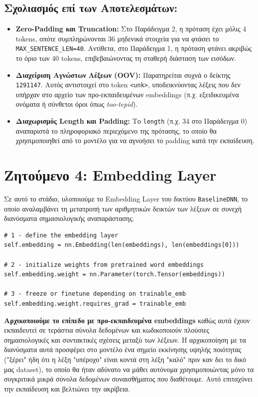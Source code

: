 \documentclass[12pt]{article}
\begin{document}
\subsection*{Σχολιασμός επί των Αποτελεσμάτων:}
\begin{itemize}
    \item \textbf{Zero-Padding και Truncation:} Στο Παράδειγμα 2, η πρόταση έχει μόλις 4 tokens, οπότε συμπληρώνονται 36 μηδενικά στοιχεία για να φτάσει το \texttt{MAX\_SENTENCE\_LEN=40}. Αντίθετα, στο Παράδειγμα 1, η πρόταση φτάνει ακριβώς το όριο των 40 tokens, επιβεβαιώνοντας τη σταθερή διάσταση των εισόδων.
    \item \textbf{Διαχείριση Αγνώστων Λέξεων (OOV):} Παρατηρείται συχνά ο δείκτης \texttt{1291147}. Αυτός αντιστοιχεί στο token \texttt{<unk>}, υποδεικνύοντας λέξεις που δεν υπήρχαν στο αρχείο των προ-εκπαιδευμένων embeddings (π.χ. εξειδικευμένα ονόματα ή σύνθετοι όροι όπως \textit{too-tepid}).
    \item \textbf{Διαχωρισμός Length και Padding:} Το \texttt{length} (π.χ. 34 στο Παράδειγμα 0) αναπαριστά το πληροφοριακό περιεχόμενο της πρότασης, το οποίο θα χρησιμοποιηθεί από το μοντέλο για να αγνοήσει το padding κατά την εκπαίδευση.
\end{itemize}

\section{Ζητούμενο 4: Embedding Layer}

Σε αυτό το στάδιο, υλοποιούμε το Embedding Layer του δικτύου \texttt{BaselineDNN}, το οποίο αναλαμβάνει τη μετατροπή των αριθμητικών δεικτών των λέξεων σε συνεχή διανύσματα σημασιολογικής αναπαράστασης.

\begin{lstlisting}
# 1 - define the embedding layer
self.embedding = nn.Embedding(len(embeddings), len(embeddings[0]))

# 2 - initialize weights from pretrained word embeddings
self.embedding.weight = nn.Parameter(torch.Tensor(embeddings))

# 3 - freeze or finetune depending on trainable_emb
self.embedding.weight.requires_grad = trainable_emb
\end{lstlisting}

\textbf{ Αρχικοποιούμε το επίπεδο με προ-εκπαιδευμένα embeddings}
καθώς αυτά έχουν εκπαιδευτεί σε τεράστια  σύνολα δεδομένων και κωδικοποιούν πλούσιες σημασιολογικές και συντακτικές σχέσεις μεταξύ των λέξεων. Η αρχικοποίηση με τα διανύσματα αυτά προσφέρει στο μοντέλο ένα σημείο εκκίνησης υψηλής ποιότητας ("ξέρει" ήδη ότι η λέξη "υπέροχο" είναι κοντά στη λέξη "καλό" πριν καν δει το δικό μας dataset), το οποίο θα ήταν αδύνατο να μάθει αυτόνομα χρησιμοποιώντας μόνο τα συγκριτικά μικρά σύνολα δεδομένων συναισθήματος που διαθέτουμε. Αυτό επιταχύνει την εκπαίδευση και βελτιώνει την ακρίβεια.
\end{document}
